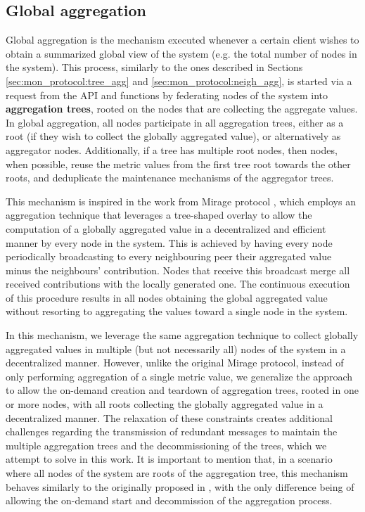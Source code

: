 \subsection{Global aggregation} \label{sec:mon_protocol:global_agg}

Global aggregation is the mechanism executed whenever a certain client wishes to obtain a summarized global view of the system (e.g. the total number of nodes in the system). This process, similarly to the ones described in Sections \ref{sec:mon_protocol:tree_agg} and \ref{sec:mon_protocol:neigh_agg}, is started via a request from the API and functions by federating nodes of the system into \textbf{aggregation trees}, rooted on the nodes that are collecting the aggregate values. In global aggregation, all nodes participate in all aggregation trees, either as a root (if they wish to collect the globally aggregated value), or alternatively as aggregator nodes. Additionally, if a tree has multiple root nodes, then nodes, when possible, reuse the metric values from the first tree root towards the other roots, and deduplicate the maintenance mechanisms of the aggregator trees. 

This mechanism is inspired in the work from Mirage protocol \cite{akosThesis}, which employs an aggregation technique that leverages a tree-shaped overlay to allow the computation of a globally aggregated value in a decentralized and efficient manner by every node in the system. This is achieved by having every node periodically broadcasting to every neighbouring peer their aggregated value minus the neighbours' contribution. Nodes that receive this broadcast merge all received contributions with the locally generated one. The continuous execution of this procedure results in all nodes obtaining the global aggregated value without resorting to aggregating the values toward a single node in the system.


In this mechanism, we leverage the same aggregation technique to collect globally aggregated values in multiple (but not necessarily all) nodes of the system in a decentralized manner. However, unlike the original Mirage protocol, instead of only performing aggregation of a single metric value, we generalize the approach to allow the on-demand creation and teardown of aggregation trees, rooted in one or more nodes, with all roots collecting the globally aggregated value in a decentralized manner. The relaxation of these constraints creates additional challenges regarding the transmission of redundant messages to maintain the multiple aggregation trees and the decommissioning of the trees, which we attempt to solve in this work. It is important to mention that, in a scenario where all nodes of the system are roots of the aggregation tree, this mechanism behaves similarly to the originally proposed in \cite{akosThesis}, with the only difference being of allowing the on-demand start and decommission of the aggregation process.

